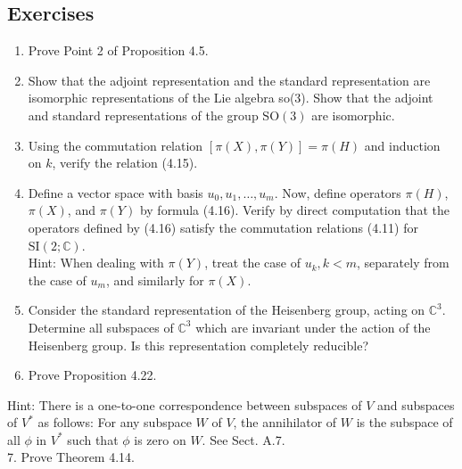 \documentclass[10pt, letterpaper]{article}
\begin{document}
\subsection*{Exercises}
\begin{enumerate}
  \item Prove Point 2 of Proposition 4.5.
  \item Show that the adjoint representation and the standard representation are isomorphic representations of the Lie algebra so(3). Show that the adjoint and standard representations of the group $\mathrm{SO}(3)$ are isomorphic.
  \item Using the commutation relation $[\pi(X), \pi(Y)]=\pi(H)$ and induction on $k$, verify the relation (4.15).
  \item Define a vector space with basis $u_{0}, u_{1}, \ldots, u_{m}$. Now, define operators $\pi(H)$, $\pi(X)$, and $\pi(Y)$ by formula (4.16). Verify by direct computation that the operators defined by (4.16) satisfy the commutation relations (4.11) for $\mathrm{SI}(2 ; \mathbb{C})$.\\
Hint: When dealing with $\pi(Y)$, treat the case of $u_{k}, k<m$, separately from the case of $u_{m}$, and similarly for $\pi(X)$.
  \item Consider the standard representation of the Heisenberg group, acting on $\mathbb{C}^{3}$. Determine all subspaces of $\mathbb{C}^{3}$ which are invariant under the action of the Heisenberg group. Is this representation completely reducible?
  \item Prove Proposition 4.22.
\end{enumerate}

Hint: There is a one-to-one correspondence between subspaces of $V$ and subspaces of $V^{*}$ as follows: For any subspace $W$ of $V$, the annihilator of $W$ is the subspace of all $\phi$ in $V^{*}$ such that $\phi$ is zero on $W$. See Sect. A.7.\\
7. Prove Theorem 4.14.
\end{document}
